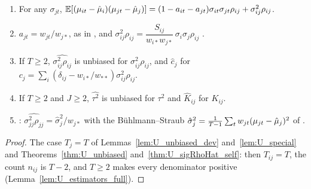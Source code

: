 \begin{corollary}\label{cor:estimation}
  \leanok
  \begin{enumerate}
    \item For any $\sigma_{jt}$,
      $\mathbb{E}[(\mu_{it}-\hat\mu_i)(\mu_{jt}-\hat\mu_j)]
       = (1 - a_{it} - a_{jt})\sigma_{it}\sigma_{jt}\rho_{ij} + \sigma^2_{ij}\rho_{ij}$.
    \item $a_{jt} = w_{jt}/w_{j*}$, as in , and
      $\sigma^2_{ij}\rho_{ij} = \dfrac{S_{ij}}{w_{i*}w_{j*}}\,\sigma_i\sigma_j\rho_{ij}$ .
    \item If $T \ge 2$, $\widehat{\sigma^2_{ij}\rho_{ij}}$ is unbiased for
      $\sigma^2_{ij}\rho_{ij}$, and $\hat c_j$ for
      $c_j = \sum_i (\delta_{ij} - w_{i*}/w_{**})\sigma^2_{ij}\rho_{ij}$.
    \item If $T \ge 2$ and $J \ge 2$, $\widehat{\tau^2}$ is unbiased for $\tau^2$
      and $\hat K_{ij}$ for $K_{ij}$.
    \item {}: $\widehat{\sigma^2_{jj}\rho_{jj}} = \hat\sigma_j^2/w_{j*}$ with the
      Bühlmann--Straub $\hat\sigma_j^2 = \frac{1}{T-1}\sum_t w_{jt}(\mu_{jt}-\hat\mu_j)^2$
      of .
  \end{enumerate}
\end{corollary}
\begin{proof}
  \leanok
  The case $T_j = T$ of Lemmas~\ref{lem:U_unbiased_dev} and~\ref{lem:U_special}
  and Theorems~\ref{thm:U_unbiased} and~\ref{thm:U_sigRhoHat_self}: then
  $T_{ij} = T$, the count $n_{ij}$ is $T - 2$, and $T \ge 2$ makes every denominator
  positive (Lemma~\ref{lem:U_estimators_full}).
\end{proof}

